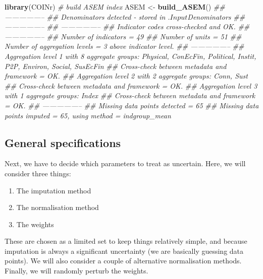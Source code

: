 \documentclass[
]{book}
\newenvironment{Shaded}{\begin{snugshade}}{\end{snugshade}}
\newcommand{\CommentTok}[1]{\textcolor[rgb]{0.56,0.35,0.01}{\textit{#1}}}
\newcommand{\KeywordTok}[1]{\textcolor[rgb]{0.13,0.29,0.53}{\textbf{#1}}}
\newcommand{\NormalTok}[1]{#1}
\newcommand{\StringTok}[1]{\textcolor[rgb]{0.31,0.60,0.02}{#1}}
\providecommand{\tightlist}{%
  \setlength{\itemsep}{0pt}\setlength{\parskip}{0pt}}
\begin{document}
\begin{Shaded}
\begin{Highlighting}[]
\KeywordTok{library}\NormalTok{(COINr)}
\CommentTok{# build ASEM index}
\NormalTok{ASEM <-}\StringTok{ }\KeywordTok{build_ASEM}\NormalTok{()}
\CommentTok{## -----------------}
\CommentTok{## Denominators detected - stored in .$Input$Denominators}
\CommentTok{## -----------------}
\CommentTok{## -----------------}
\CommentTok{## Indicator codes cross-checked and OK.}
\CommentTok{## -----------------}
\CommentTok{## Number of indicators = 49}
\CommentTok{## Number of units = 51}
\CommentTok{## Number of aggregation levels = 3 above indicator level.}
\CommentTok{## -----------------}
\CommentTok{## Aggregation level 1 with 8 aggregate groups: Physical, ConEcFin, Political, Instit, P2P, Environ, Social, SusEcFin}
\CommentTok{## Cross-check between metadata and framework = OK.}
\CommentTok{## Aggregation level 2 with 2 aggregate groups: Conn, Sust}
\CommentTok{## Cross-check between metadata and framework = OK.}
\CommentTok{## Aggregation level 3 with 1 aggregate groups: Index}
\CommentTok{## Cross-check between metadata and framework = OK.}
\CommentTok{## -----------------}
\CommentTok{## Missing data points detected = 65}
\CommentTok{## Missing data points imputed = 65, using method = indgroup_mean}
\end{Highlighting}
\end{Shaded}

\hypertarget{general-specifications}{%
\subsection{General specifications}\label{general-specifications}}

Next, we have to decide which parameters to treat as uncertain. Here, we will consider three things:

\begin{enumerate}
\def\labelenumi{\arabic{enumi}.}
\tightlist
\item
  The imputation method
\item
  The normalisation method
\item
  The weights
\end{enumerate}

These are chosen as a limited set to keep things relatively simple, and because imputation is always a significant uncertainty (we are basically guessing data points). We will also consider a couple of alternative normalisation methods. Finally, we will randomly perturb the weights.
\end{document}
